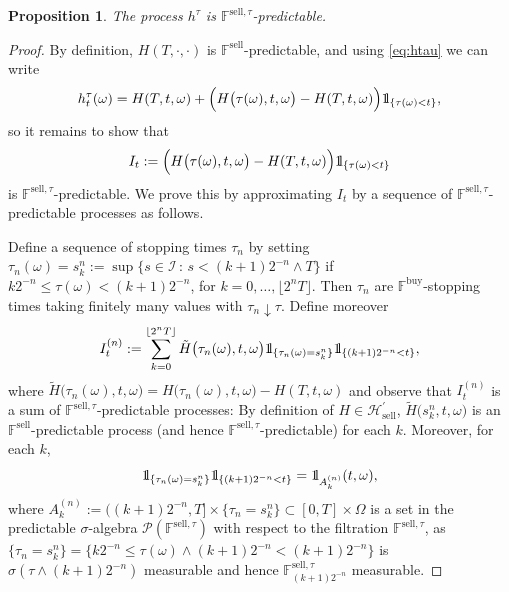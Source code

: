 \documentclass{article}
\def\ind{{\mathchoice{1\mskip-4mu\mathrm l}{1\mskip-4mu\mathrm l}
		{1\mskip-4.5mu\mathrm l}{1\mskip-5mu\mathrm l}}}
\newtheorem{proposition}[definition]{Proposition}
\begin{document}
\begin{proposition}
	The process $h^\tau$ is $\mathbb{F}^{\text{sell},\tau}$-predictable.
\end{proposition}

\begin{proof}
	By definition, $H(T, \cdot, \cdot)$ is $\mathbb{F}^{\text{sell}}$-predictable, and using \eqref{eq:htau} we can write
	\[
		h^\tau_t(\omega) = H(T, t, \omega)+ \Bigl(H\bigl(\tau(\omega),t,\omega\bigr)- H(T, t, \omega)\Bigr)\ind_{\{\tau(\omega)<t\}},
	\]
	so it remains to show that 
	\[
		I_t:= \Bigl(H\bigl(\tau(\omega),t,\omega\bigr)- H(T, t, \omega)\Bigr)\ind_{\{\tau(\omega)<t\}}
	\]
	is $\mathbb{F}^{\text{sell}, \tau}$-predictable. We prove this by approximating $I_t$ by a sequence of $\mathbb{F}^{\text{sell}, \tau}$-predictable processes as 			follows.

	Define a sequence of stopping times $\tau_n$ by setting $\tau_n(\omega) = s_k^n := \sup\bigl\{ s \in \mathcal{I} \, : \, s< (k+1)2^{-n} \wedge T\bigr\}$ if $k2^{-n} 		\leq \tau(\omega) < (k+1)2^{-n}$, for $k=0, \hdots, \lfloor 2^n T\rfloor$. Then $\tau_n$ are $\mathbb{F}^\text{buy}$-stopping times taking finitely many values with 		$\tau_n \downarrow \tau$. Define moreover
	\[
		I^{(n)}_t:=  \sum_{k=0}^{\lfloor 2^nT\rfloor} \tilde{H}\bigl(\tau_n(\omega),t,\omega\bigr) \ind_{\{\tau_n(\omega)= s_k^n\}}
		\ind_{\{(k+1)2^{-n}<t\}},
	\]
	where $\tilde{H}\bigl(\tau_n(\omega),t,\omega\bigr) = H\bigl(\tau_n(\omega),t,\omega\bigr)- H(T, t, \omega)$ and observe that $I^{(n)}_t$ is a sum of
	$\mathbb{F}^{\text{sell}, \tau}$-predictable processes: By definition of $H\in \mathcal H^\prime_\text{sell}$, $\tilde{H}\bigl(s_k^n,t,\omega\bigr) $ is an
	$\mathbb{F}^{\text{sell}}$-predictable process (and hence $\mathbb{F}^{\text{sell},\tau}$-predictable) for each $k$. Moreover, for each $k$,
	\[
		\ind_{\{\tau_n(\omega)=s_k^n\}}\ind_{\{(k+1)2^{-n}<t\}} = \ind_{A^{(n)}_k}(t,\omega),
	\]
	where $A^{(n)}_k:= ((k+1)2^{-n}, T] \times \{\tau_n = s_k^n  \}\subset [0,T]\times \Omega$  is a set in the predictable $\sigma$-algebra $\mathcal{P}						(\mathbb{F}^{\text{sell},\tau})$ with respect to the filtration $\mathbb{F}^{\text{sell},\tau}$, as $\bigl\{\tau_n = s_k^n\bigr\} =\bigl\{k2^{-n} \leq \tau(\omega) 			\wedge (k+1)2^{-n}<(k+1)2^{-n}\bigr\}$ is $\sigma(\tau\wedge (k+1)2^{-n})$ measurable and hence $\mathbb{F}^{\text{sell},\tau}_{(k+1)2^{-n}}$ measurable.


\end{proof}
\end{document}
